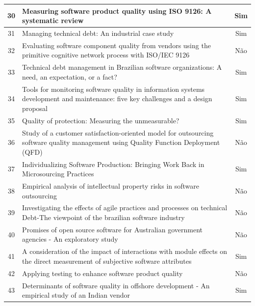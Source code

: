 \begin{longtable}{|c|p{11.5cm}|c|}
    \hline
    30 & Measuring software product quality using ISO 9126: A systematic review~\cite{iso9126review} & Sim \\
    \hline
    31 & Managing technical debt: An industrial case study~\cite{managingtd2015} & Sim \\
    \hline
    32 & Evaluating software component quality from vendors using the primitive cognitive network process with ISO/IEC 9126~\cite{pcnp2019vendors} & Não \\
    \hline
    33 & Technical debt management in Brazilian software organizations: A need, an expectation, or a fact?~\cite{silva2018} & Sim \\
    \hline
    34 & Tools for monitoring software quality in information systems development and maintenance: five key challenges and a design proposal~\cite{tools2020monitoring} & Sim \\
    \hline
    35 & Quality of protection: Measuring the unmeasurable?~\cite{measuringunmeasurable} & Sim \\
    \hline
    36 & Study of a customer satisfaction-oriented model for outsourcing software quality management using Quality Function Deployment (QFD)~\cite{qfd2008outsourcing} & Não \\
    \hline
    37 & Individualizing Software Production: Bringing Work Back in Microsourcing Practices~\cite{microsourcing2020} & Sim \\
    \hline
    38 & Empirical analysis of intellectual property risks in software outsourcing~\cite{iprisk2020} & Não \\
    \hline
    39 & Investigating the effects of agile practices and processes on technical Debt-The viewpoint of the brazilian software industry~\cite{agile2018debt} & Não \\
    \hline
    40 & Promises of open source software for Australian government agencies - An exploratory study~\cite{opensource2015australia} & Não \\
    \hline
    41 & A consideration of the impact of interactions with module effects on the direct measurement of subjective software attributes~\cite{module2001subjective} & Sim \\
    \hline
    42 & Applying testing to enhance software product quality~\cite{applying2013testing} & Não \\
    \hline
    43 & Determinants of software quality in offshore development - An empirical study of an Indian vendor~\cite{gopal2011offshore} & Sim \\

\end{longtable}
